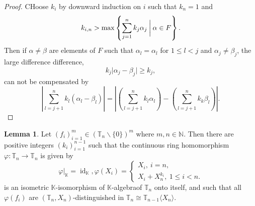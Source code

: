 \documentclass[10pt]{article}
\numberwithin{equation}{section}
\theoremstyle{definition}
\newtheorem{lemma}{Lemma}[subsection]
\DeclareMathOperator{\id}{id}
\newcommand{\N}[0]{\mathbb{N}}
\newcommand{\ab}[1]{\vert #1 \vert}
\begin{document}
\begin{proof}
    CHoose $k_i$ by downward induction on $i$ such that $k_n=1$ and 
    \begin{equation*}
    k_{i,n}>\max\left\{\sum_{j=1}^n k_j\alpha_j\:\bigg{\vert}\: \alpha\in F\right\}.
    \end{equation*}
    Then if $\alpha\not=\beta$ are elements of $F$ such that $\alpha_l=\alpha_l$ for $1\leq l<j$ and $\alpha_j\not=\beta_j$, the large difference difference,
    \begin{equation*}
        k_j\ab{\alpha_j-\beta_j}\geq k_j,
    \end{equation*}
    can not be compensated by 
    \begin{equation*}
        \left\vert\sum_{l=j+1}^n k_l(\alpha_l-\beta_l)\right\vert = \left\vert\left(\sum_{l=j+1}^n k_l\alpha_l\right)-\left(\sum_{l=j+1}^nk_k\beta_l\right)\right\vert.
    \end{equation*}
\end{proof}

\begin{lemma}
    \label{lemma_29_1}
    Let $(f_i)_{i=1}^m\in(\mathbb{T}_n\backslash\{0\})^m$ where $m,n\in\N$. Then there are positive integers $(k_i)_{i=1}^{n-1}$ such that the continuous ring homomorphism $\varphi:\mathbb{T}_n\to\mathbb{T}_n$ is given by
    \begin{equation*}
        \varphi|_\mathbb{K} = \id_\mathbb{K},\varphi(X_i)=\begin{cases}
            X_i,\: i=n,\\
            X_i+X_n^{k_i},\:1\leq i<n.
        \end{cases}
    \end{equation*}
    is an isometric $\mathbb{K}$-isomorphism of $\mathbb{K}$-algebraof $\mathbb{T}_n$ onto itself, and such that all $\varphi(f_i)$ are $(\mathbb{T}_n,X_n)$-distinguished in $\mathbb{T}_n\cong \mathbb{T}_{n-1}\langle X_n\rangle$.
\end{lemma}

\end{document}
